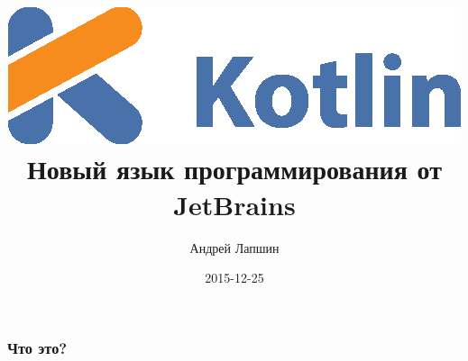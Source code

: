 \documentclass[lualatex]{beamer}
\author{Андрей Лапшин}
\date{2015-12-25}
\title{
    \includegraphics{pics/logo_kotlin}\\
    Новый язык программирования от JetBrains
}
\begin{document}
\begin{frame}
    \titlepage
\end{frame}

\begin{frame}
    \frametitle{Что это?}

\end{frame}
\end{document}
